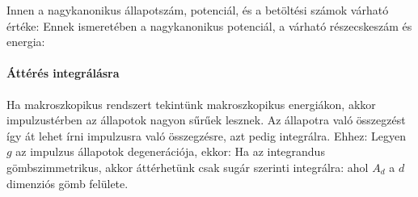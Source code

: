    Innen a nagykanonikus állapotszám, potenciál, és a betöltési számok várható értéke:
   Ennek ismeretében a nagykanonikus potenciál, a várható részecskeszám és energia:
   
   \paragraph{Áttérés integrálásra}
    
    Ha makroszkopikus rendszert tekintünk makroszkopikus energiákon, akkor impulzustérben az állapotok nagyon sűrűek lesznek.
   Az állapotra való összegzést így át lehet írni impulzusra való összegzésre, azt pedig integrálra.
   Ehhez:
    Legyen $g$ az impulzus állapotok degenerációja, ekkor:
    Ha az integrandus gömbszimmetrikus, akkor áttérhetünk csak sugár szerinti integrálra:
    ahol $A_d$ a $d$ dimenziós gömb felülete.
    
